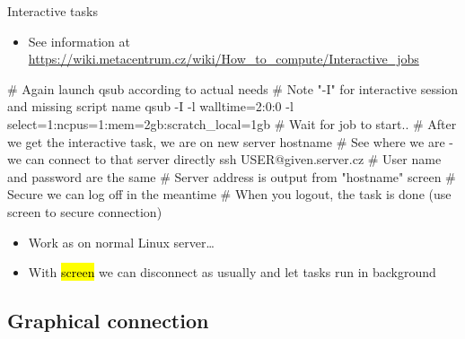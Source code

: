 \documentclass[compress, ucs, xelatex, 11pt, xcolor=svgnames,
  hyperref={
    bookmarks=true,
    unicode=true,
    colorlinks=true,
    pdftitle={Linux, command line and MetaCentrum},
    plainpages=false,
    pdfauthor={Vojtech Zeisek},
    pdfsubject={Course about use of Linux command line, writing shell scripts and using MetaCentrum of CESNET},
    pdfcreator={XeLaTeX},
    pdfkeywords={Linux, GNU, BASH, shell, command line, MetaCentrum},
    linkcolor=DarkRed,
    anchorcolor=DarkBlue,
    citecolor=Indigo,
    filecolor=NavyBlue,
    menucolor=DarkMagenta,
    urlcolor=DarkBlue,
    pdftex},
  url={hyphens, lowtilde} %
  ]{beamer}
\renewcommand{\texttt}[1]{\hl{\ttfamily #1}}
\begin{document}
\begin{frame}[fragile]{Interactive tasks}
  \begin{itemize}
    \item See information at \url{https://wiki.metacentrum.cz/wiki/How_to_compute/Interactive_jobs}
  \end{itemize}
  \begin{bashcode}
    # Again launch qsub according to actual needs
    # Note "-I" for interactive session and missing script name
    qsub -I -l walltime=2:0:0 -l select=1:ncpus=1:mem=2gb:scratch_local=1gb
    # Wait for job to start..
    # After we get the interactive task, we are on new server
    hostname # See where we are - we can connect to that server directly
    ssh USER@given.server.cz # User name and password are the same
                             # Server address is output from "hostname"
    screen # Secure we can log off in the meantime
    # When you logout, the task is done (use screen to secure connection)
  \end{bashcode}
  \begin{itemize}
    \item Work as on normal Linux server\ldots
    \item With \texttt{screen} we can disconnect as usually and let tasks run in background
  \end{itemize}
\end{frame}

\subsection{Graphical connection}
\end{document}
